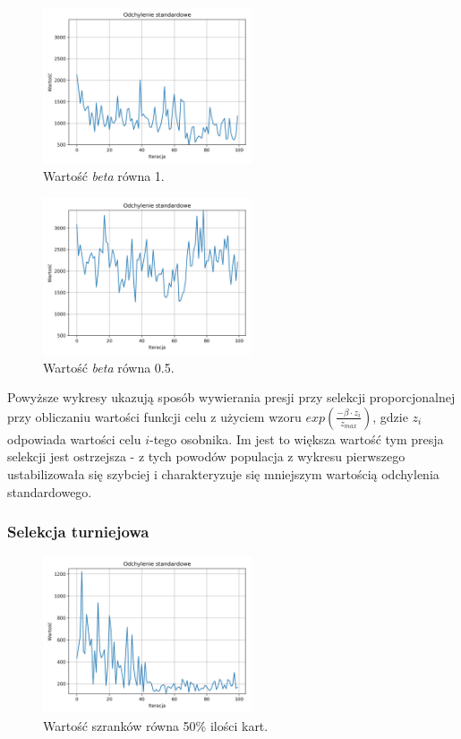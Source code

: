 \documentclass[12pt]{article}
\begin{document}
\begin{figure}[ht]
	\centering					\includegraphics[width=0.55\textwidth]{roulette_3.png}
	\caption{Wartość \textit{beta} równa 1.}
	\label{fig1}
\end{figure}


\begin{figure}[ht]
	\centering					\includegraphics[width=0.55\textwidth]{roulette_4.png}
	\caption{Wartość \textit{beta} równa 0.5.}
	\label{fig1}
\end{figure}

Powyższe wykresy ukazują sposób wywierania presji przy selekcji proporcjonalnej przy obliczaniu wartości funkcji celu z użyciem wzoru  $exp(\frac{- \beta \cdot z_i}{z_{max}})$, gdzie $z_i$ odpowiada wartości celu $i$-tego osobnika. Im jest to większa wartość tym presja selekcji jest ostrzejsza - z tych powodów populacja z wykresu pierwszego ustabilizowała się szybciej i charakteryzuje się mniejszym wartością odchylenia standardowego.


\newpage

\subsubsection{Selekcja turniejowa}

\begin{figure}[ht]
	\centering					\includegraphics[width=0.55\textwidth]{tournament_1.png}
	\caption{Wartość szranków równa 50\% ilości kart.}
	\label{fig1}
\end{figure}
\end{document}
